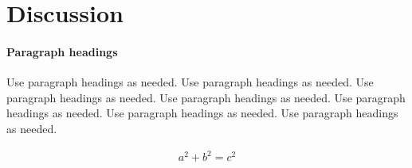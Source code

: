 \documentclass[smallextended]{svjour3}       %
\begin{document}
\hypertarget{sec:6}{%
\section{Discussion}\label{sec:discussion}}




\hypertarget{paragraph-headings}{%
\paragraph{Paragraph headings}\label{paragraph-headings}}

Use paragraph headings as needed. 
Use paragraph headings as needed. 
Use paragraph headings as needed. 
Use paragraph headings as needed. 
Use paragraph headings as needed. 
Use paragraph headings as needed. 
Use paragraph headings as needed. 

\begin{align}
a^2+b^2=c^2
\end{align}




\end{document}
